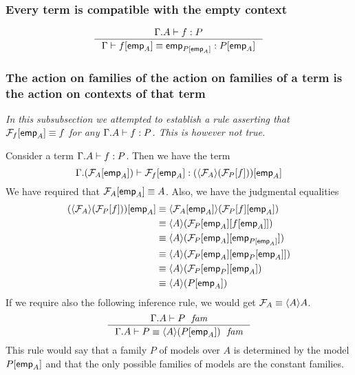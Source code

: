 \subsubsection{Every term is compatible with the empty context}
\begin{equation*}
\inference
  { \jterm{{\Gamma}{A}}{P}{f}
    }
  { \jtermeq
      {\Gamma}
      {\subst{\tfemp{A}}{P}}
      {\subst{\tfemp{A}}{f}}
      {\tfemp{\subst{\tfemp{A}}{P}}}
    }
\end{equation*}

\subsubsection{The action on families of the action on families of a term is the action
on contexts of that term}
\emph{In this subsubsection we attempted to establish a rule asserting that
$\subst{\tfemp{A}}{\mfam{f}}\jdeq f$ for any $\jterm{{\Gamma}{A}}{P}{f}$. This
is however not true.}

Consider a term $\jterm{{\Gamma}{A}}{P}{f}$. Then we have the term
\begin{equation*}
\jterm
  {{\Gamma}{\subst{\tfemp{A}}{\mfam{A}}}}
  {\subst{\tfemp{A}}{\ctxwk{\mfam{A}}{\subst{f}{\mfam{P}}}}}
  {\subst{\tfemp{A}}{\mfam{f}}}
\end{equation*}
We have required that $\subst{\tfemp{A}}{\mfam{A}}\jdeq A$. Also, we have the
judgmental equalities
\begin{align*}
\subst{\tfemp{A}}{\ctxwk{\mfam{A}}{\subst{f}{\mfam{P}}}}
& \jdeq
  \ctxwk{\subst{\tfemp{A}}{\mfam{A}}}{\subst{\tfemp{A}}{{f}{\mfam{P}}}}
  \\
& \jdeq
  \ctxwk{A}{\subst{{\tfemp{A}}{f}}{{\tfemp{A}}{\mfam{P}}}}
  \\
& \jdeq
  \ctxwk{A}{\subst{\tfemp{\subst{\tfemp{A}}{P}}}{{\tfemp{A}}{\mfam{P}}}}
  \\
& \jdeq
  \ctxwk{A}{\subst{{\tfemp{A}}{\tfemp{P}}}{{\tfemp{A}}{\mfam{P}}}}
  \\
& \jdeq
  \ctxwk{A}{\subst{\tfemp{A}}{{\tfemp{P}}{\mfam{P}}}}
  \\
& \jdeq
  \ctxwk{A}{\subst{\tfemp{A}}{P}}
\end{align*}
If we require also the following inference rule, we would get $\mfam{A}\jdeq
\ctxwk{A}{A}$.
\begin{equation*}
\inference
  { \jfam{{\Gamma}{A}}{P}
    }
  { \jfameq{{\Gamma}{A}}{P}{\ctxwk{A}{\subst{\tfemp{A}}{P}}}
    }
\end{equation*}
This rule would say that a family $P$ of models over $A$ is determined by the
model $\subst{\tfemp{A}}{P}$ and that the only possible families of models
are the constant families.

